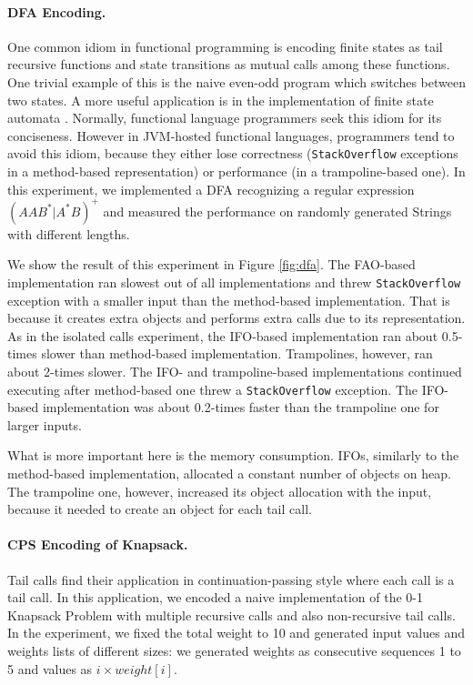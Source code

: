 \paragraph{DFA Encoding.}\label{sec:dfa}

One common idiom in functional programming is encoding finite states
as tail recursive functions and state transitions as mutual calls
among these functions. One trivial example of this is the naive
even-odd program which switches between two states. A more useful
application is in the implementation of finite state automata
\cite{Krishnamurthi2006}. Normally, functional language programmers
seek this idiom for its conciseness. However in JVM-hosted functional
languages, programmers tend to avoid this idiom, because they either
lose correctness (\lstinline{StackOverflow} exceptions in a
method-based representation) or performance (in a trampoline-based
one). In this experiment, we implemented a DFA recognizing a regular
expression $(AAB^{*}|A^{*}B)^{+}$ and measured the performance on
randomly generated Strings with different lengths.

We show the result of this experiment in Figure \ref{fig:dfa}. The
FAO-based implementation ran slowest out of all implementations and threw
\lstinline{StackOverflow} exception with a smaller input than the
method-based implementation. That is because it creates extra objects
and performs extra calls due to its representation. As in the isolated
calls experiment, the IFO-based implementation ran about 0.5-times slower than method-based
implementation. Trampolines, however, ran about 2-times slower. The IFO-
and trampoline-based implementations continued executing after method-based
one threw a \lstinline{StackOverflow} exception. The IFO-based
implementation was about 0.2-times faster than the trampoline one for 
larger inputs.

What is more important here is the memory consumption. IFOs, similarly
to the method-based implementation, allocated a constant number of
objects on heap. The trampoline one, however, increased its object
allocation with the input, because it needed to create an object for 
each tail call.

\paragraph{CPS Encoding of Knapsack.}\label{sec:cps}

Tail calls find their application in continuation-passing style
\cite{Steele1975} where each call is a tail call.  In this
application, we encoded a naive implementation of the 0-1 Knapsack
Problem with multiple recursive calls and also non-recursive tail
calls.  In the experiment, we fixed the total weight to 10 and
generated input values and weights lists of different sizes: we
generated weights as consecutive sequences 1 to 5 and values as
$i\times weight[i]$.


